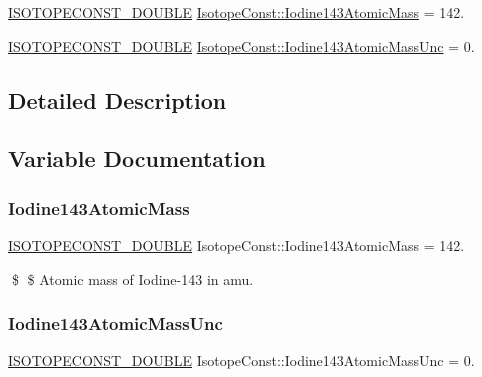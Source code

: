 \begin{DoxyCompactItemize}
\item 
\mbox{\hyperlink{group___isotope_const-_macros_ga8f45a7272ce02c0b4c65c44636ed719a}{I\+S\+O\+T\+O\+P\+E\+C\+O\+N\+S\+T\+\_\+\+D\+O\+U\+B\+LE}} \mbox{\hyperlink{group___isotope_const-_iodine-_i143_gae7069863a8a210ff96fe87c7945973ce}{Isotope\+Const\+::\+Iodine143\+Atomic\+Mass}} = 142.
\item 
\mbox{\hyperlink{group___isotope_const-_macros_ga8f45a7272ce02c0b4c65c44636ed719a}{I\+S\+O\+T\+O\+P\+E\+C\+O\+N\+S\+T\+\_\+\+D\+O\+U\+B\+LE}} \mbox{\hyperlink{group___isotope_const-_iodine-_i143_ga5228579f9324e1f44cfd45ee5df6eae0}{Isotope\+Const\+::\+Iodine143\+Atomic\+Mass\+Unc}} = 0.
\end{DoxyCompactItemize}


\subsection{Detailed Description}


\subsection{Variable Documentation}
\mbox{\label{group___isotope_const-_iodine-_i143_gae7069863a8a210ff96fe87c7945973ce}} 
\subsubsection{\texorpdfstring{Iodine143\+Atomic\+Mass}{Iodine143AtomicMass}}
{\footnotesize\ttfamily \mbox{\hyperlink{group___isotope_const-_macros_ga8f45a7272ce02c0b4c65c44636ed719a}{I\+S\+O\+T\+O\+P\+E\+C\+O\+N\+S\+T\+\_\+\+D\+O\+U\+B\+LE}} Isotope\+Const\+::\+Iodine143\+Atomic\+Mass = 142.}

\$ \$ Atomic mass of Iodine-\/143 in amu. \mbox{\label{group___isotope_const-_iodine-_i143_ga5228579f9324e1f44cfd45ee5df6eae0}} 
\subsubsection{\texorpdfstring{Iodine143\+Atomic\+Mass\+Unc}{Iodine143AtomicMassUnc}}
{\footnotesize\ttfamily \mbox{\hyperlink{group___isotope_const-_macros_ga8f45a7272ce02c0b4c65c44636ed719a}{I\+S\+O\+T\+O\+P\+E\+C\+O\+N\+S\+T\+\_\+\+D\+O\+U\+B\+LE}} Isotope\+Const\+::\+Iodine143\+Atomic\+Mass\+Unc = 0.}

